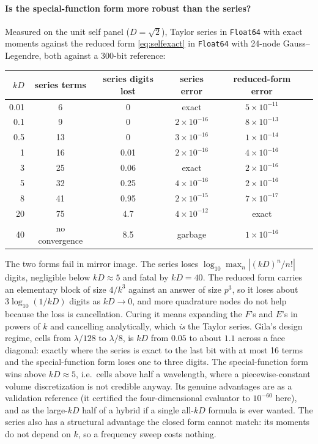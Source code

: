 \documentclass[11pt]{article}
\theoremstyle{remark}
\newcommand{\code}[1]{\texttt{#1}}
\begin{document}
\paragraph{Is the special-function form more robust than the series?} Measured on
the unit self panel ($D = \sqrt 2$), Taylor series in \code{Float64} with exact
moments against the reduced form \eqref{eq:selfexact} in \code{Float64} with 24-node
Gauss--Legendre, both against a 300-bit reference:

\begin{center}
\small
\begin{tabular}{@{}rccccc@{}}
\toprule
$kD$ & series terms & series digits lost & series error & reduced-form error \\
\midrule
0.01 & 6 & 0 & exact & $5\times10^{-11}$ \\
0.1 & 9 & 0 & $2\times10^{-16}$ & $8\times10^{-13}$ \\
0.5 & 13 & 0 & $3\times10^{-16}$ & $1\times10^{-14}$ \\
1 & 16 & 0.01 & $2\times10^{-16}$ & $4\times10^{-16}$ \\
3 & 25 & 0.06 & exact & $2\times10^{-16}$ \\
5 & 32 & 0.25 & $4\times10^{-16}$ & $2\times10^{-16}$ \\
8 & 41 & 0.95 & $2\times10^{-15}$ & $7\times10^{-17}$ \\
20 & 75 & 4.7 & $4\times10^{-12}$ & exact \\
40 & no convergence & 8.5 & garbage & $1\times10^{-16}$ \\
\bottomrule
\end{tabular}
\end{center}

The two forms fail in mirror image. The series loses $\log_{10}\max_n |(kD)^n/n!|$
digits, negligible below $kD\approx 5$ and fatal by $kD = 40$. The reduced form
carries an elementary block of size $4/k^3$ against an answer of size $p^3$, so it
loses about $3\log_{10}(1/kD)$ digits as $kD\to 0$, and more quadrature nodes do not
help because the loss is cancellation. Curing it means expanding the $F$'s and $E$'s in
powers of $k$ and cancelling analytically, which \emph{is} the Taylor series. Gila's
design regime, cells from $\lambda/128$ to $\lambda/8$, is $kD$ from $0.05$ to about
$1.1$ across a face diagonal: exactly where the series is exact to the last bit with at
most 16 terms and the special-function form loses one to three digits. The
special-function form wins above $kD\approx 5$, i.e.\ cells above half a wavelength,
where a piecewise-constant volume discretization is not credible anyway. Its genuine
advantages are as a validation reference (it certified the four-dimensional evaluator
to $10^{-60}$ here), and as the large-$kD$ half of a hybrid if a single all-$kD$
formula is ever wanted. The series also has a structural advantage the closed form
cannot match: its moments do not depend on $k$, so a frequency sweep costs nothing.
\end{document}
